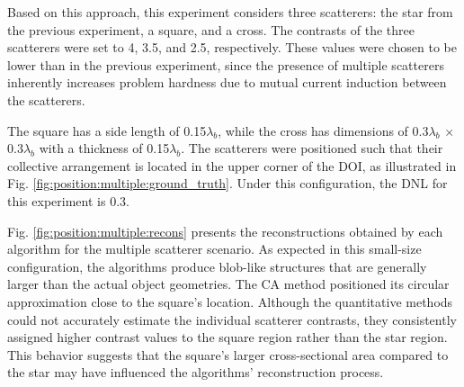 \documentclass{IEEEtran}
\begin{document}
                Based on this approach, this experiment considers three scatterers: the star from the previous experiment, a square, and a cross. The contrasts of the three scatterers were set to 4, 3.5, and 2.5, respectively. These values were chosen to be lower than in the previous experiment, since the presence of multiple scatterers inherently increases problem hardness due to mutual current induction between the scatterers.

                The square has a side length of 0.15$\lambda_b$, while the cross has dimensions of 0.3$\lambda_b$ × 0.3$\lambda_b$ with a thickness of 0.15$\lambda_b$. The scatterers were positioned such that their collective arrangement is located in the upper corner of the DOI, as illustrated in Fig. \ref{fig:position:multiple:ground_truth}. Under this configuration, the DNL for this experiment is 0.3.

                Fig. \ref{fig:position:multiple:recons} presents the reconstructions obtained by each algorithm for the multiple scatterer scenario. As expected in this small-size configuration, the algorithms produce blob-like structures that are generally larger than the actual object geometries. The CA method positioned its circular approximation close to the square's location. Although the quantitative methods could not accurately estimate the individual scatterer contrasts, they consistently assigned higher contrast values to the square region rather than the star region. This behavior suggests that the square's larger cross-sectional area compared to the star may have influenced the algorithms' reconstruction process.
\end{document}
